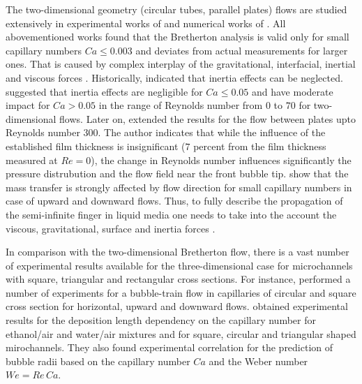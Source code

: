 \documentclass{article}
\begin{document}
The two-dimensional geometry (circular tubes, parallel plates) flows are studied extensively in
experimental works of \citet{aussillous-deposition, cerro-bubble-train} and numerical works of
\citet{giavedoni-numerical,heil-bretherton}. All abovementioned works found that the Bretherton
analysis is valid only for small capillary numbers $Ca\leq 0.003$ and deviates from actual
measurements for larger ones.
That is caused by complex interplay of the gravitational,
interfacial, inertial and viscous forces \cite{gupta-review}. Historically, 
\citet{bretherton} indicated that inertia effects can be 
neglected. \citet{giavedoni-numerical} suggested
that
inertia effects
are negligible for $Ca \leq 0.05$ and have moderate impact for $Ca>0.05$ in the range of Reynolds
number from $0$ to $70$ for two-dimensional flows. Later on, \citet{heil-bretherton}
extended
the results for the flow between plates upto Reynolds number
$300$. The author indicates that while the influence of the established film thickness is
insignificant
($7$ percent from the film thickness measured at $Re=0$), the change in Reynolds number 
influences significantly the pressure distrubution and the flow field near the front bubble tip.
\citet{cerro-bubble-train} show that the mass transfer is strongly affected by flow direction for
small capillary numbers in case of upward and downward flows. Thus, to fully describe the
propagation of the semi-infinite finger in liquid media one needs to take into the account the
viscous, gravitational, surface and inertia forces \cite{gupta-review}.  

In comparison with the two-dimensional Bretherton flow, there is a vast number of experimental
results available for the three-dimensional case for microchannels with square, triangular and
rectangular cross sections. For instance, \citet{cerro-bubble-train} performed a number of
experiments for a
bubble-train flow in capillaries of
circular and square cross section for horizontal, upward and downward flows.
\citet{shikazono-square} obtained
experimental
results for the deposition length dependency on the
capillary number for ethanol/air and water/air mixtures and for square, circular and triangular
shaped mirochannels. They also found experimental correlation for the prediction of bubble radii
based on the capillary number $Ca$ and the Weber number $We=Re\,Ca$. 
\end{document}
